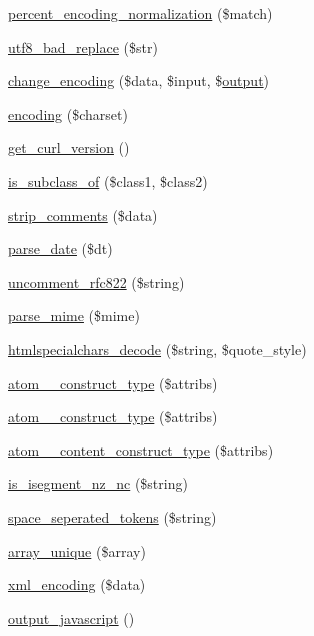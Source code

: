 \begin{DoxyCompactItemize}
\hyperlink{class_simple_pie___misc_ac1df541113a1cbe15e4734850aa64d7e}{percent\-\_\-encoding\-\_\-normalization} (\$match)
\item 
\hyperlink{class_simple_pie___misc_a411c35bab692490003189d805fff386b}{utf8\-\_\-bad\-\_\-replace} (\$str)
\item 
\hyperlink{class_simple_pie___misc_a49cdf2459bc7c61720de0b8354cd7d6c}{change\-\_\-encoding} (\$data, \$input, \$\hyperlink{testthreadexecutor_8cpp_a2369284a02343f6cea00e0e992c138ce}{output})
\item 
\hyperlink{class_simple_pie___misc_ad2412ad20736c943586ec04516b30b9b}{encoding} (\$charset)
\item 
\hyperlink{class_simple_pie___misc_ac18444efc14f4ce478d503872698618f}{get\-\_\-curl\-\_\-version} ()
\item 
\hyperlink{class_simple_pie___misc_a6fefdb902f5b1826f2b6e07ca200f565}{is\-\_\-subclass\-\_\-of} (\$class1, \$class2)
\item 
\hyperlink{class_simple_pie___misc_ad162039ae58bfa147268594cd7c54eae}{strip\-\_\-comments} (\$data)
\item 
\hyperlink{class_simple_pie___misc_a27f128fb8d415f9cb85111d803715dd2}{parse\-\_\-date} (\$dt)
\item 
\hyperlink{class_simple_pie___misc_a90813cd0034bf475010d748905154e66}{uncomment\-\_\-rfc822} (\$string)
\item 
\hyperlink{class_simple_pie___misc_a550a17f36a5f22d95afb61b908bee8aa}{parse\-\_\-mime} (\$mime)
\item 
\hyperlink{class_simple_pie___misc_a986222ef599ebda10fd11ca44391ff52}{htmlspecialchars\-\_\-decode} (\$string, \$quote\-\_\-style)
\item 
\hyperlink{class_simple_pie___misc_a56c4844b73ed4e4239c73e7338e77916}{atom\-\_\-\_\-construct\-\_\-type} (\$attribs)
\item 
\hyperlink{class_simple_pie___misc_ace2d3c814e03c11c0a10b25b941735ff}{atom\-\_\-\_\-construct\-\_\-type} (\$attribs)
\item 
\hyperlink{class_simple_pie___misc_a79117c4ca0af0ac2368915da0806a50c}{atom\-\_\-\_\-content\-\_\-construct\-\_\-type} (\$attribs)
\item 
\hyperlink{class_simple_pie___misc_ae86986fa607943a2b176183fa820356a}{is\-\_\-isegment\-\_\-nz\-\_\-nc} (\$string)
\item 
\hyperlink{class_simple_pie___misc_ab43ef529d9f9f096d705c1aeaece44e9}{space\-\_\-seperated\-\_\-tokens} (\$string)
\item 
\hyperlink{class_simple_pie___misc_a966fc518098e1a98c3c6d654145bf766}{array\-\_\-unique} (\$array)
\item 
\hyperlink{class_simple_pie___misc_a2fc183050056ea622461fd169967cd0a}{xml\-\_\-encoding} (\$data)
\item 
\hyperlink{class_simple_pie___misc_a273a230dd333b50a04f6a3b0dc4017be}{output\-\_\-javascript} ()
\end{DoxyCompactItemize}
